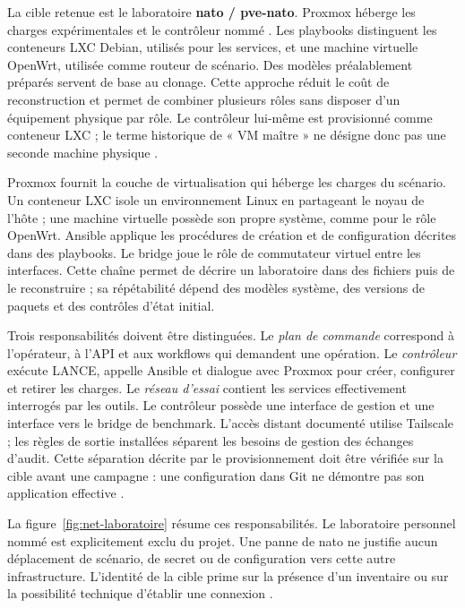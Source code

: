 \documentclass[11pt,a4paper]{article}
\DeclareRobustCommand{\code}[1]{{\small\path{#1}}}
\begin{document}
La cible retenue est le laboratoire \textbf{nato / pve-nato}. Proxmox héberge
les charges expérimentales et le contrôleur nommé \code{nato-master}. Les
playbooks distinguent les conteneurs LXC Debian, utilisés pour les services,
et une machine virtuelle OpenWrt, utilisée comme routeur de scénario. Des
modèles préalablement préparés servent de base au clonage. Cette approche
réduit le coût de reconstruction et permet de combiner plusieurs rôles sans
disposer d'un équipement physique par rôle. Le contrôleur lui-même est
provisionné comme conteneur LXC ; le terme historique de « VM maître » ne
désigne donc pas une seconde machine physique \cite{net-master,net-deploy}.

Proxmox fournit la couche de virtualisation qui héberge les charges du
scénario. Un conteneur LXC isole un environnement Linux en partageant le noyau
de l'hôte ; une machine virtuelle possède son propre système, comme pour le
rôle OpenWrt. Ansible applique les procédures de création et de configuration
décrites dans des playbooks. Le bridge joue le rôle de commutateur virtuel
entre les interfaces. Cette chaîne permet de décrire un laboratoire dans des
fichiers puis de le reconstruire ; sa répétabilité dépend des modèles système,
des versions de paquets et des contrôles d'état initial.

Trois responsabilités doivent être distinguées. Le \emph{plan de commande}
correspond à l'opérateur, à l'API et aux workflows qui demandent une opération.
Le \emph{contrôleur} exécute LANCE, appelle Ansible et dialogue avec Proxmox pour
créer, configurer et retirer les charges. Le \emph{réseau d'essai} contient les
services effectivement interrogés par les outils. Le contrôleur possède une
interface de gestion et une interface vers le bridge de benchmark. L'accès
distant documenté utilise Tailscale ; les règles de sortie installées séparent
les besoins de gestion des échanges d'audit. Cette séparation décrite par le
provisionnement doit être vérifiée sur la cible avant une campagne : une
configuration dans Git ne démontre pas son application effective
\cite{net-master,net-access}.

La figure~\ref{fig:net-laboratoire} résume ces responsabilités. Le laboratoire
personnel nommé \code{pve} est explicitement exclu du projet. Une panne de
nato ne justifie aucun déplacement de scénario, de secret ou de configuration
vers cette autre infrastructure. L'identité de la cible prime sur la présence
d'un inventaire ou sur la possibilité technique d'établir une connexion
\cite{net-scope}.
\end{document}

